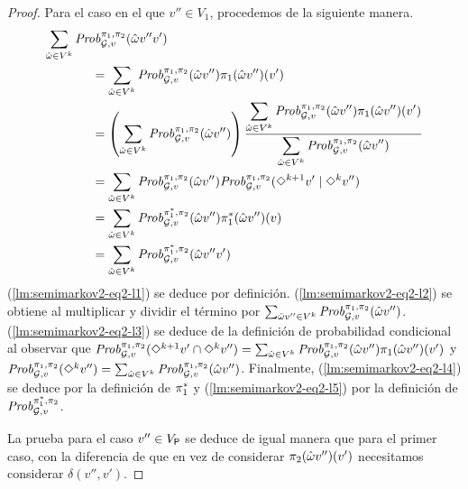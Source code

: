 \begin{proof}
  Para el caso en el que $v'' \in V_1$, procedemos de la siguiente manera.
  \begin{align}	
    \sum_{\hat{\omega} \in V^k}\Prob{\strat{1}}{\strat{2}}_{\StochG,v}(\hat{\omega}v''v') \hspace{-6em} & \notag\\
    \label{lm:semimarkov2-eq2-l1}
    & = \sum_{\hat{\omega} \in V^k}\Prob{\strat{1}}{\strat{2}}_{\StochG,v}(\hat{\omega}v'') \strat{1}(\hat{\omega}v'')(v')\\
    \label{lm:semimarkov2-eq2-l2}
    & = \left( \sum_{\hat{\omega} \in V^k}\Prob{\strat{1}}{\strat{2}}_{\StochG,v}(\hat{\omega}v'') \right) \frac{\displaystyle\sum_{\hat{\omega} \in V^k}\Prob{\strat{1}}{\strat{2}}_{\StochG,v}(\hat{\omega}v'') \strat{1}(\hat{\omega}v'')(v')}{\displaystyle\sum_{\hat{\omega} \in V^k}\Prob{\strat{1}}{\strat{2}}_{\StochG,v}(\hat{\omega}v'')} \\
    \label{lm:semimarkov2-eq2-l3}
    & = \sum_{\hat{\omega} \in V^k}\Prob{\strat{1}}{\strat{2}}_{\StochG,v}(\hat{\omega}v'') \Prob{\strat{1}}{\strat{2}}_{\StochG,v}(\Diamond^{k+1} v' \mid \Diamond^k v'') \\
    \label{lm:semimarkov2-eq2-l4}
    & = \sum_{\hat{\omega} \in V^k}\Prob{\starredstrat{1}}{\strat{2}}_{\StochG,v}(\hat{\omega}v'') \starredstrat{1}(\hat{\omega}v'')(v)\\
    \label{lm:semimarkov2-eq2-l5}
    & = \sum_{\hat{\omega} \in V^k}\Prob{\starredstrat{1}}{\strat{2}}_{\StochG,v}(\hat{\omega}v''v')
  \end{align}
  (\ref{lm:semimarkov2-eq2-l1}) se deduce por definición.
  (\ref{lm:semimarkov2-eq2-l2}) se obtiene al multiplicar y dividir el término por
  $\sum_{\hat{\omega}v'' \in V^k}\mathit{Prob}^{\pi_{1}, \pi_{2}}_{\mathcal{G},v}(\hat{\omega}v'')$.
  (\ref{lm:semimarkov2-eq2-l3}) se deduce de la definición de probabilidad condicional al observar que
  $\mathit{Prob}^{\pi_{1}, \pi_{2}}_{\mathcal{G},v}({\Diamond^{k+1} v'} \cap {\Diamond^k v''}) =
  \sum_{\hat{\omega} \in V^k}\mathit{Prob}^{\pi_{1}, \pi_{2}}_{\mathcal{G},v}(\hat{\omega}v'') \pi_{1}(\hat{\omega}v'')(v')$
  y 
  $\mathit{Prob}^{\pi_{1}, \pi_{2}}_{\mathcal{G},v}(\Diamond^{k} v'') =
  \sum_{\hat{\omega} \in V^k}\mathit{Prob}^{\pi_{1}, \pi_{2}}_{\mathcal{G},v}(\hat{\omega}v'')$.
  Finalmente, (\ref{lm:semimarkov2-eq2-l4}) se deduce por la definición de
  $\pi^*_{1}$ y (\ref{lm:semimarkov2-eq2-l5}) por la definición de 
  $\mathit{Prob}^{\pi^*_{1}, \pi_{2}}_{\mathcal{G},v}$.

  La prueba para el caso $v'' \in V_{\mathsf{P}}$ se deduce de igual manera que para el primer caso, con la diferencia de que en vez de considerar
  $\pi_{2}(\hat{\omega}v'')(v')$ necesitamos considerar
  $\delta(v'',v')$.




\end{proof}
